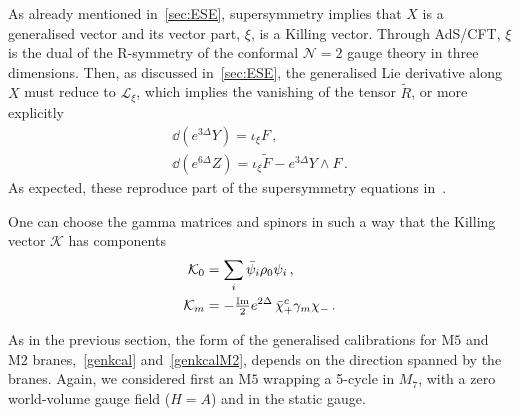 \documentclass[debug]{phd}
\begin{document}
As already mentioned in~\cref{sec:ESE}, supersymmetry implies that $X$ is a generalised vector and its vector part, $\xi$, is a Killing vector. 
Through AdS/CFT, $\xi$ is the dual of the R-symmetry of the conformal $\mathcal{N}=2$ gauge theory in three dimensions. 
Then, as discussed in~\cref{sec:ESE}, the generalised Lie derivative along $X$ must reduce to $\mathcal{L}_\xi$, which implies the vanishing of the tensor $\tilde{R}$, or more explicitly
		\begin{equation}
		\label{M7Rvan}
			\begin{array}{l}
				\dd  (e^{3\Delta}Y)=\iota_{\xi} F\, , \\
				\dd  (e^{6\Delta}Z)= \iota_{\xi} \tilde{F} -e^{3\Delta} Y \wedge F\, .
			\end{array}
		\end{equation}
As expected, these reproduce part of the supersymmetry equations in~\cite{Gabella:2012rc}.	
	
%

One can choose the gamma matrices and spinors in such a way that the Killing vector $\mathcal{K}$ has components~\cite{Gabella:2012rc} 
%
	\begin{equation}
		\begin{split}
			\mathcal{K}_0 & = \sum_i \bar{\psi}_i\rho_0 \psi_i\, , \\
			\mathcal{K}_m & = - \tfrac{\operatorname{\mathbb{I}m}}{2} e^{2\Delta}\, \bar{\chi}^c_+ \gamma_m \chi_- \, .
		\end{split}
	\end{equation}
%


As in the previous section, the form of the generalised calibrations for $\mathrm{M}5$ and $\mathrm{M}2$ branes,~\eqref{genkcal} and~\eqref{genkcalM2}, depends on the direction spanned by the branes. 
Again, we considered first an $\mathrm{M}5$ wrapping a 5-cycle in $M_7$, with a zero world-volume gauge field ($H = A$) and in the static gauge. 
\end{document}
